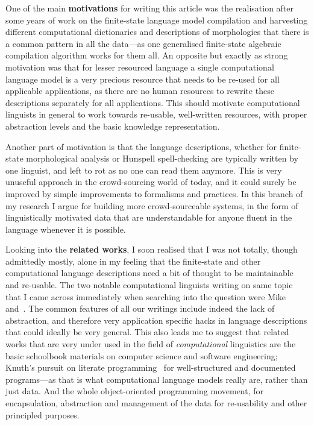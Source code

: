 \documentclass[officiallayout,draft]{unihelcompling}
\begin{document}
One of the main \textbf{motivations} for writing this article was the
realisation after some years of work on the finite-state language model
compilation and harvesting different computational dictionaries and
descriptions of morphologies that there is a common pattern in all the
data---as one generalised finite-state algebraic compilation algorithm works
for them all. An opposite but exactly as strong motivation was that for lesser
resourced language a single computational language model is a very precious
resource that needs to be re-used for all applicable applications, as there are
no human resources to rewrite these descriptions separately for all
applications. This should motivate computational linguists in general to work
towards re-usable, well-written resources, with proper abstraction levels and
the basic knowledge representation.

Another part of motivation is that the language descriptions, whether for
finite-state morphological analysis or Hunspell spell-checking are typically
written by one linguist, and left to rot as no one can read them anymore.  This
is very unuseful approach in the crowd-sourcing world of today, and it could
surely be improved by simple improvements to formalisms and practices.  In this
branch of my research I argue for building more crowd-sourceable systems, in
the form of linguistically motivated data that are understandable for anyone
fluent in the language whenever it is possible.

Looking into the \textbf{related works}, I soon realised that I was not
totally, though admittedly mostly, alone in my feeling that the finite-state
and other computational language descriptions need a bit of thought to be
maintainable and re-usable. The two notable computational linguists writing on
same topic that I came across immediately when searching into the question were
Mike~\citet{maxwell2008joint} and~\citet{wintner2008strengths}. The
common features of all our writings include indeed the lack of abstraction, and
therefore very application specific hacks in language descriptions that could
ideally be very general. This also leads me to suggest that related works that
are very under used in the field of \emph{computational} linguistics are the
basic schoolbook materials on computer science and software engineering;
Knuth's pursuit on literate programming~\citep{knuth1984literate} for
well-structured and documented programs---as that is what computational
language models really are, rather than just data. And the whole
object-oriented programming movement, for encapsulation, abstraction and
management of the data for re-usability and other principled purposes.
\end{document}
